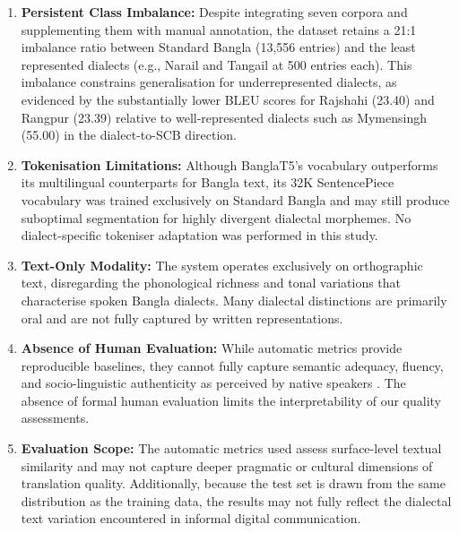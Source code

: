 \documentclass[12pt,a4paper]{article}
\begin{document}
\begin{enumerate}[leftmargin=*]
    \item \textbf{Persistent Class Imbalance:} Despite integrating seven corpora and supplementing them with manual annotation, the dataset retains a 21:1 imbalance ratio between Standard Bangla (13,556 entries) and the least represented dialects (e.g., Narail and Tangail at 500 entries each). This imbalance constrains generalisation for underrepresented dialects, as evidenced by the substantially lower BLEU scores for Rajshahi (23.40) and Rangpur (23.39) relative to well-represented dialects such as Mymensingh (55.00) in the dialect-to-SCB direction.
    \item \textbf{Tokenisation Limitations:} Although BanglaT5's vocabulary outperforms its multilingual counterparts for Bangla text, its 32K SentencePiece vocabulary was trained exclusively on Standard Bangla and may still produce suboptimal segmentation for highly divergent dialectal morphemes. No dialect-specific tokeniser adaptation was performed in this study.
    \item \textbf{Text-Only Modality:} The system operates exclusively on orthographic text, disregarding the phonological richness and tonal variations that characterise spoken Bangla dialects. Many dialectal distinctions are primarily oral and are not fully captured by written representations.
    \item \textbf{Absence of Human Evaluation:} While automatic metrics provide reproducible baselines, they cannot fully capture semantic adequacy, fluency, and socio-linguistic authenticity as perceived by native speakers \cite{mathur-etal-2020-tangled}. The absence of formal human evaluation limits the interpretability of our quality assessments.
    \item \textbf{Evaluation Scope:} The automatic metrics used assess surface-level textual similarity and may not capture deeper pragmatic or cultural dimensions of translation quality. Additionally, because the test set is drawn from the same distribution as the training data, the results may not fully reflect the dialectal text variation encountered in informal digital communication.
\end{enumerate}
\end{document}
